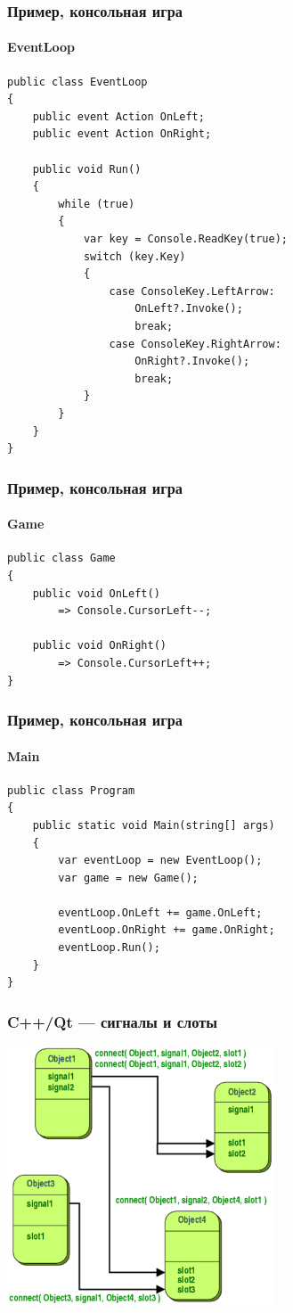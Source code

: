 \documentclass[xetex,mathserif,serif]{beamer}
\begin{document}
	\begin{frame}[fragile]
		\frametitle{Пример, консольная игра}
		\framesubtitle{EventLoop}
		\begin{scriptsize}
			\begin{verbatim}
public class EventLoop
{
    public event Action OnLeft;
    public event Action OnRight;

    public void Run()
    {
        while (true)
        {
            var key = Console.ReadKey(true);
            switch (key.Key)
            {
                case ConsoleKey.LeftArrow:
                    OnLeft?.Invoke();
                    break;
                case ConsoleKey.RightArrow:
                    OnRight?.Invoke();
                    break;
            }
        }
    }
}
			\end{verbatim}
		\end{scriptsize}
	\end{frame}

	\begin{frame}[fragile]
		\frametitle{Пример, консольная игра}
		\framesubtitle{Game}
		\begin{verbatim}
public class Game
{
    public void OnLeft()
        => Console.CursorLeft--;

    public void OnRight()
        => Console.CursorLeft++;
}
		\end{verbatim}
	\end{frame}

	\begin{frame}[fragile]
		\frametitle{Пример, консольная игра}
		\framesubtitle{Main}
		\begin{verbatim}
public class Program
{
    public static void Main(string[] args)
    {
        var eventLoop = new EventLoop();
        var game = new Game();

        eventLoop.OnLeft += game.OnLeft;
        eventLoop.OnRight += game.OnRight;
        eventLoop.Run();
    }
}
		\end{verbatim}
	\end{frame}

	\begin{frame}
		\frametitle{C++/Qt --- сигналы и слоты}
		\begin{center}
			\includegraphics[width=0.6\textwidth]{signalsSlots.png}
		\end{center}
	\end{frame}
\end{document}
